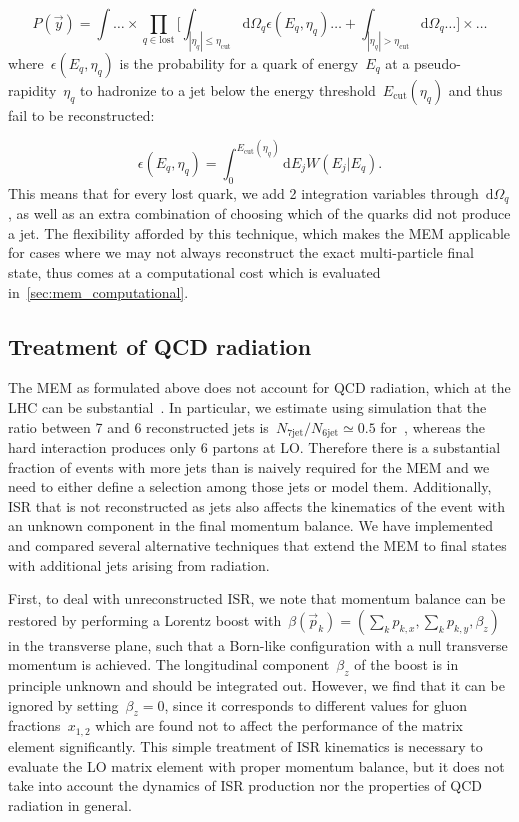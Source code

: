\begin{equation}
P(\vec{y}) = \int \dots \times \prod_{q\in\mathrm{lost}} \biggl[ \int_{|\eta_q| \leq \eta_{\mathrm{cut}}} \mathrm{d}\Omega_q \epsilon(E_q, \eta_q) \dots + \int_{|\eta_q| > \eta_{\mathrm{cut}}} \mathrm{d}\Omega_q \dots \biggr] \times \dots
\end{equation}
where~$\epsilon(E_q, \eta_q)$ is the probability for a quark of energy~$E_q$ at a pseudo-rapidity~$\eta_q$ to hadronize to a jet below the energy threshold~$E_{\mathrm{cut}}(\eta_q)$ and thus fail to be reconstructed:

\begin{equation}
\epsilon(E_q, \eta_q) = \int_0^{E_{\mathrm{cut}}(\eta_q)} \mathrm{d}E_j W(E_j | E_q).
\end{equation}
This means that for every lost quark, we add 2 integration variables through~$\mathrm{d}\Omega_q$, as well as an extra combination of choosing which of the quarks did not produce a jet. The flexibility afforded by this technique, which makes the MEM applicable for cases where we may not always reconstruct the exact multi-particle final state, thus comes at a computational cost which is evaluated in~\cref{sec:mem_computational}.

\subsection{Treatment of QCD radiation}
\label{sec:mem_radiation}

The MEM as formulated above does not account for QCD radiation, which at the LHC can be substantial~\cite{Alwall:2010cq}. In particular, we estimate using simulation that the ratio between 7 and 6 reconstructed jets is~$N_{7\mathrm{jet}}/N_{6\mathrm{jet}} \simeq 0.5$ for~\ttHbb, whereas the hard interaction produces only 6 partons at LO. Therefore there is a substantial fraction of events with more jets than is naively required for the MEM and we need to either define a selection among those jets or model them. Additionally, ISR that is not reconstructed as jets also affects the kinematics of the event with an unknown component in the final momentum balance. We have implemented and compared several alternative techniques that extend the MEM to final states with additional jets arising from radiation.

First, to deal with unreconstructed ISR, we note that momentum balance can be restored by performing a Lorentz boost with~$\beta(\vec{p}_k) = (\sum_k p_{k,x}, \sum_k p_{k,y}, \beta_z)$ in the transverse plane, such that a Born-like configuration with a null transverse momentum is achieved. The longitudinal component~$\beta_z$ of the boost is in principle unknown and should be integrated out. However, we find that it can be ignored by setting~$\beta_z = 0$, since it corresponds to different values for gluon fractions~$x_{1,2}$ which are found not to affect the performance of the matrix element significantly. This simple treatment of ISR kinematics is necessary to evaluate the LO matrix element with proper momentum balance, but it does not take into account the dynamics of ISR production nor the properties of QCD radiation in general.


